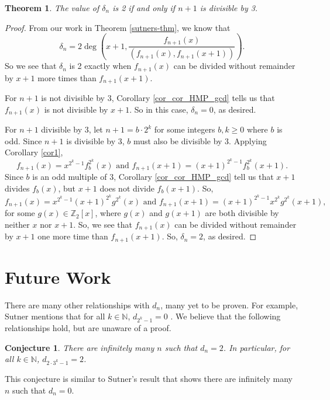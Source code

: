 \documentclass[a4paper]{article}
\newtheorem{theorem}{Theorem}[section]
\newtheorem{conjecture}{Conjecture}[section]
\newcommand{\Z}{\mathbb{Z}}
\newcommand{\N}{\mathbb{N}}
\begin{document}
	\begin{theorem}\label{when-is-deltan-2}
		The value of $\delta_n$ is 2 if and only if $n+1$ is divisible by 3.
	\end{theorem}
	\begin{proof}
		From our work in Theorem \ref{sutners-thm}, we know that
		\begin{equation*}
			\delta_n = 2\deg\left(x+1,\frac{f_{n+1}(x)}{(f_{n+1}(x),f_{n+1}(x+1))}\right).
		\end{equation*}
		So we see that $\delta_n$ is 2 exactly when $f_{n+1}(x)$ can be divided without remainder by $x+1$ more times than $f_{n+1}(x+1)$.
		
		For $n+1$ is not divisible by 3, Corollary \ref{cor_cor_HMP_gcd} tells us that $f_{n+1}(x)$ is not divisible by $x+1$.
		So in this case, $\delta_n = 0$, as desired.
		
		For $n+1$ divisible by 3, let $n+1 = b \cdot 2^k$ for some integers $b, k \geq 0$ where $b$ is odd.
		Since $n+1$ is divisible by 3, $b$ must also be divisible by 3.
		Applying Corollary \ref{cor1},
		\begin{equation*}
			f_{n+1}(x) = x^{2^k - 1}f_{b}^{2^k}(x) \text{ and } f_{n+1}(x+1) = (x+1)^{2^k - 1}f_{b}^{2^k}(x+1).
		\end{equation*}
		Since $b$ is an odd multiple of 3, Corollary \ref{cor_cor_HMP_gcd} tell us that $x+1$ divides $f_b(x)$, but $x+1$ does not divide $f_b(x+1)$.
		So,
		\begin{equation*}
			f_{n+1}(x) = x^{2^k - 1}(x+1)^{2^k}g^{2^k}(x) \text{ and } f_{n+1}(x+1) = (x+1)^{2^k - 1}x^{2^k}g^{2^k}(x+1),
		\end{equation*} 
		for some $g(x) \in \Z_2[x]$, where $g(x)$ and $g(x+1)$ are both divisible by neither $x$ nor $x+1$.
		So, we see that $f_{n+1}(x)$ can be divided without remainder by $x+1$ one more time than $f_{n+1}(x+1)$.
		So, $\delta_n = 2$, as desired.
	\end{proof}

	\section{Future Work}
	There are many other relationships with $d_n$, many yet to be proven.
	For example, Sutner mentions that for all $k \in \N$, $d_{2^k - 1} = 0$ \cite{Sutner1989}.
	We believe that the following relationships hold, but are unaware of a proof.
	
	\begin{conjecture}\label{conj-all-2}
		There are infinitely many $n$ such that $d_n = 2$.
		In particular, for all $k \in \N$, $d_{2\cdot 3^{k} - 1} = 2$.
	\end{conjecture}
	This conjecture is similar to Sutner's result that shows there are infinitely many $n$ such that $d_n = 0$.
	
\end{document}
